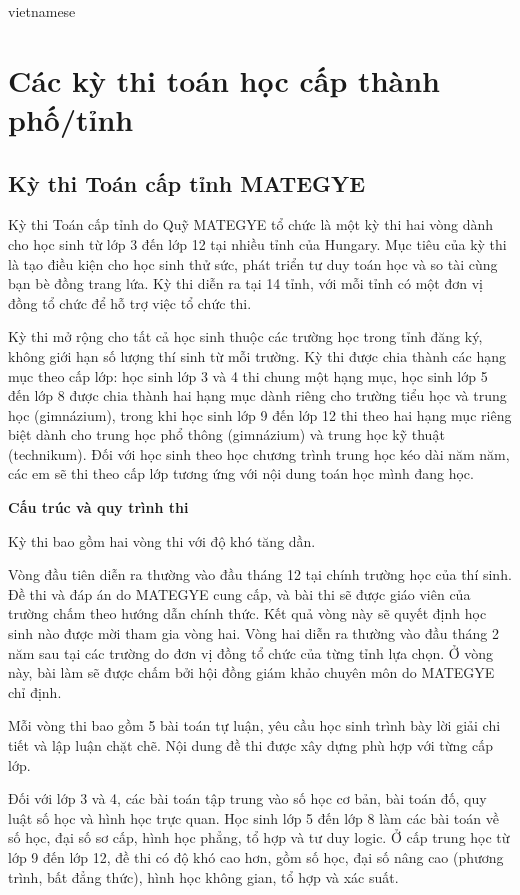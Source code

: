 \documentclass{article}
\begin{document}
\begin{otherlanguage*}{vietnamese}
\newpage

\section{Các kỳ thi toán học cấp thành phố/tỉnh}

\subsection{Kỳ thi Toán cấp tỉnh MATEGYE}

Kỳ thi Toán cấp tỉnh do Quỹ MATEGYE tổ chức là một kỳ thi hai vòng dành cho học sinh từ lớp 3 đến lớp 12 tại nhiều tỉnh của Hungary.
Mục tiêu của kỳ thi là tạo điều kiện cho học sinh thử sức, phát triển tư duy toán học và so tài cùng bạn bè đồng trang lứa.
Kỳ thi diễn ra tại 14 tỉnh, với mỗi tỉnh có một đơn vị đồng tổ chức để hỗ trợ việc tổ chức thi.

Kỳ thi mở rộng cho tất cả học sinh thuộc các trường học trong tỉnh đăng ký, không giới hạn số lượng thí sinh từ mỗi trường.
Kỳ thi được chia thành các hạng mục theo cấp lớp: học sinh lớp 3 và 4 thi chung một hạng mục,
học sinh lớp 5 đến lớp 8 được chia thành hai hạng mục dành riêng cho trường tiểu học và trung học (gimnázium),
trong khi học sinh lớp 9 đến lớp 12 thi theo hai hạng mục riêng biệt dành cho trung học phổ thông (gimnázium) và trung học kỹ thuật (technikum).
Đối với học sinh theo học chương trình trung học kéo dài năm năm, các em sẽ thi theo cấp lớp tương ứng với nội dung toán học mình đang học.

\textbf{Cấu trúc và quy trình thi}

Kỳ thi bao gồm hai vòng thi với độ khó tăng dần.
\begin{enumerate}[topsep=0pt, partopsep=0pt, itemsep=0pt]
    \ii Vòng đầu tiên diễn ra thường vào đầu tháng 12 tại chính trường học của thí sinh. Đề thi và đáp án do MATEGYE cung cấp,
    và bài thi sẽ được giáo viên của trường chấm theo hướng dẫn chính thức. Kết quả vòng này sẽ quyết định học sinh nào được mời tham gia vòng hai.
    \ii Vòng hai diễn ra thường vào đầu tháng 2 năm sau tại các trường do đơn vị đồng tổ chức của từng tỉnh lựa chọn.
    Ở vòng này, bài làm sẽ được chấm bởi hội đồng giám khảo chuyên môn do MATEGYE chỉ định.
\end{enumerate}

Mỗi vòng thi bao gồm 5 bài toán tự luận, yêu cầu học sinh trình bày lời giải chi tiết và lập luận chặt chẽ. Nội dung đề thi được xây dựng phù hợp với từng cấp lớp.
\begin{itemize}[topsep=0pt, partopsep=0pt, itemsep=0pt]
    \ii Đối với lớp 3 và 4, các bài toán tập trung vào số học cơ bản, bài toán đố, quy luật số học và hình học trực quan.
    \ii Học sinh lớp 5 đến lớp 8 làm các bài toán về số học, đại số sơ cấp, hình học phẳng, tổ hợp và tư duy logic.
    \ii Ở cấp trung học từ lớp 9 đến lớp 12, đề thi có độ khó cao hơn, gồm số học, đại số nâng cao (phương trình, bất đẳng thức), hình học không gian, tổ hợp và xác suất.
\end{itemize}


\end{otherlanguage*}
\end{document}
